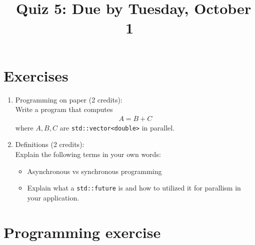 \documentclass[11pt]{article}
\begin{document}
\title{\coursename~Quiz 5: Due by Tuesday, October 1}
\date{}
\maketitle

\medskip


\section*{Exercises}

\begin{enumerate}
\item Programming on paper (2 credits): \\
Write a program that computes
\begin{align*}
A = B + C
\end{align*}
where $A,B,C$ are \lstinline|std::vector<double>| in parallel.

\item Definitions (2 credits): \\
Explain the following terms in your own words:
\begin{itemize}
\item Asynchronous vs synchronous programming
\item Explain what a \lstinline|std::future| is and how to utilized it for parallism in your application.
\end{itemize}


\end{enumerate}

\section*{Programming exercise}
\end{document}

